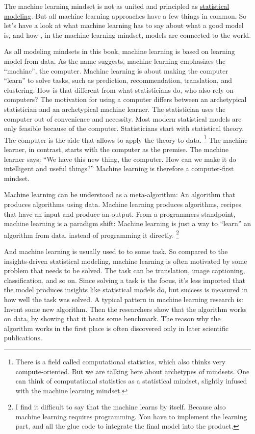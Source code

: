 \documentclass[
  10pt,
]{scrbook}
\begin{document}
The machine learning mindset is not as united and principled as \protect\hyperlink{statistical-modeling}{statistical modeling}.
But all machine learning approaches have a few things in common.
So let's have a look at what machine learning has to say about what a good model is, and how , in the machine learning mindset, models are connected to the world.

As all modeling mindsets in this book, machine learning is based on learning model from data.
As the name suggests, machine learning emphasizes the ``machine'', the computer.
Machine learning is about making the computer ``learn'' to solve tasks, such as prediction, recommendation, translation, and clustering.
How is that different from what statisticians do, who also rely on computers?
The motivation for using a computer differs between an archetypical statistician and an archetypical machine learner.
The statistician uses the computer out of convenience and necessity.
Most modern statistical models are only feasible because of the computer.
Statisticians start with statistical theory.
The computer is the aide that allows to apply the theory to data. \footnote{There is a field called computational statistics, which also thinks very compute-oriented. But we are talking here about archetypes of mindsets. One can think of computational statistics as a statistical mindset, slightly infused with the machine learning mindset.}
The machine learner, in contrast, starts with the computer as the premise.
The machine learner says: ``We have this new thing, the computer. How can we make it do intelligent and useful things?''
Machine learning is therefore a computer-first mindset.

Machine learning can be understood as a meta-algorithm: An algorithm that produces algorithms using data.
Machine learning produces algorithms, recipes that have an input and produce an output.
From a programmers standpoint, machine learning is a paradigm shift:
Machine learning is just a way to ``learn'' an algorithm from data, instead of programming it directly. \footnote{I find it difficult to say that the machine learns by itself. Because also machine learning requires programming. You have to implement the learning part, and all the glue code to integrate the final model into the product.}

And machine learning is usually used to to some task.
So compared to the insights-driven statistical modeling, machine learning is often motivated by some problem that needs to be solved.
The task can be translation, image captioning, classification, and so on.
Since solving a task is the focus, it's less imported that the model produces insights like statistical models do, but success is measured in how well the task was solved.
A typical pattern in machine learning research is:
Invent some new algorithm.
Then the researchers show that the algorithm works on data, by showing that it beats some benchmark.
The reason why the algorithm works in the first place is often discovered only in later scientific publications.
\end{document}
